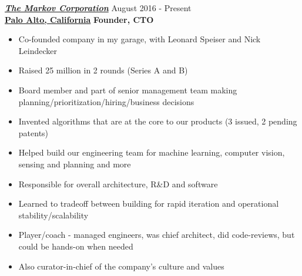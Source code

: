 \vspace{8pt}
{\sl \href{http://www.markovcorp.com}{\textbf{The Markov Corporation}}} \hfill        August 2016 - Present \\
\href{http://www.markovcorp.com}{\textbf{Palo Alto, California}}       \hfill   \textbf{Founder, CTO}
   \begin{itemize} \itemsep -2pt %
   \item Co-founded company in my garage, with Leonard Speiser and Nick Leindecker
   \item Raised 25 million in 2 rounds (Series A and B)
   \item Board member and part of senior management team making planning/prioritization/hiring/business decisions
   \item Invented algorithms that are at the core to our products (3 issued, 2 pending patents)
   \item Helped build our engineering team for machine learning, computer vision, sensing and planning and more
   \item Responsible for overall architecture, R\&D and software
   \item Learned to tradeoff between building for rapid iteration and operational stability/scalability
   \item Player/coach - managed engineers, was chief architect, did code-reviews, but could be hands-on when needed
   \item Also curator-in-chief of the company's culture and values
\end{itemize}


